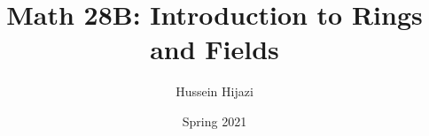 \documentclass[../Main.tex]{subfiles}
\begin{document}
\title{\textbf { Math 28B: Introduction to Rings and Fields}}
\author{Hussein Hijazi}
\date{Spring 2021 }
\maketitle
\end{document}
